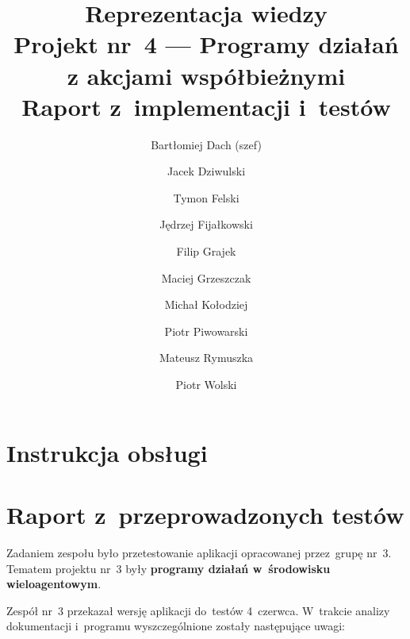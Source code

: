 \documentclass[11pt,a4paper]{article}
\begin{document}
\title{Reprezentacja wiedzy \\
\Large{
    Projekt nr~4 --- Programy działań z akcjami współbieżnymi \\
    Raport z~implementacji i~testów
}}
\author{
    Bartłomiej Dach (szef) \and
    Jacek Dziwulski \and
    Tymon Felski \and
    Jędrzej Fijałkowski \and
    Filip Grajek \and
    Maciej Grzeszczak \and
    Michał Kołodziej \and
    Piotr Piwowarski \and
    Mateusz Rymuszka \and
    Piotr Wolski
}
\maketitle

\section{Instrukcja obsługi}

\section{Raport z~przeprowadzonych testów}
\label{sec:our-tests-report}

Zadaniem zespołu było przetestowanie aplikacji opracowanej przez~grupę nr~3.
Tematem projektu nr~3 były \textbf{programy działań w~środowisku wieloagentowym}.

Zespół nr~3 przekazał wersję aplikacji do~testów 4~czerwca.
W~trakcie analizy dokumentacji i~programu wyszczególnione zostały następujące uwagi:
\end{document}
